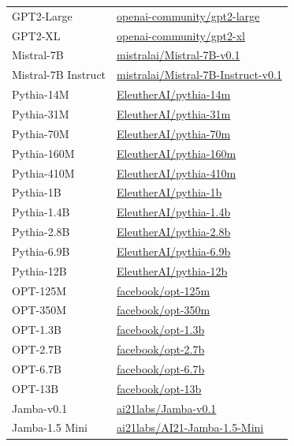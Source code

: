 \documentclass{article} \usepackage{iclr2025_conference,times}
\begin{document}
\begin{table}[htbp]
\begin{center}
\begin{tabular}{l|l}
GPT2-Large & \href{https://huggingface.co/openai-community/gpt2-large}{openai-community/gpt2-large}\\
GPT2-XL & \href{https://huggingface.co/openai-community/gpt2-xl}{openai-community/gpt2-xl}\\
\midrule
Mistral-7B & \href{https://huggingface.co/mistralai/Mistral-7B-v0.1}{mistralai/Mistral-7B-v0.1}\\
Mistral-7B Instruct & \href{https://huggingface.co/mistralai/Mistral-7B-Instruct-v0.1}{mistralai/Mistral-7B-Instruct-v0.1} \\
\midrule
Pythia-14M & \href{https://huggingface.co/EleutherAI/pythia-14m}{EleutherAI/pythia-14m} \\
Pythia-31M & \href{https://huggingface.co/EleutherAI/pythia-31m}{EleutherAI/pythia-31m} \\
Pythia-70M & \href{https://huggingface.co/EleutherAI/pythia-70m}{EleutherAI/pythia-70m} \\
Pythia-160M & \href{https://huggingface.co/EleutherAI/pythia-160m}{EleutherAI/pythia-160m} \\
Pythia-410M & \href{https://huggingface.co/EleutherAI/pythia-410m}{EleutherAI/pythia-410m} \\
Pythia-1B & \href{https://huggingface.co/EleutherAI/pythia-1b}{EleutherAI/pythia-1b} \\
Pythia-1.4B & \href{https://huggingface.co/EleutherAI/pythia-1.4b}{EleutherAI/pythia-1.4b} \\
Pythia-2.8B & \href{https://huggingface.co/EleutherAI/pythia-2.8b}{EleutherAI/pythia-2.8b} \\
Pythia-6.9B & \href{https://huggingface.co/EleutherAI/pythia-6.9b}{EleutherAI/pythia-6.9b} \\
Pythia-12B & \href{https://huggingface.co/EleutherAI/pythia-12b}{EleutherAI/pythia-12b} \\
\midrule
OPT-125M & \href{https://huggingface.co/facebook/opt-125m}{facebook/opt-125m} \\
OPT-350M & \href{https://huggingface.co/facebook/opt-350m}{facebook/opt-350m} \\
OPT-1.3B & \href{https://huggingface.co/facebook/opt-1.3b}{facebook/opt-1.3b} \\
OPT-2.7B & \href{https://huggingface.co/facebook/opt-2.7b}{facebook/opt-2.7b} \\
OPT-6.7B & \href{https://huggingface.co/facebook/opt-6.7b}{facebook/opt-6.7b} \\
OPT-13B & \href{https://huggingface.co/facebook/opt-13b}{facebook/opt-13b} \\
\midrule
Jamba-v0.1 &  \href{https://huggingface.co/ai21labs/Jamba-v0.1}{ai21labs/Jamba-v0.1} \\
Jamba-1.5 Mini & \href{https://huggingface.co/ai21labs/AI21-Jamba-1.5-Mini}{ai21labs/AI21-Jamba-1.5-Mini} \\
\bottomrule
\end{tabular}
\end{center}
\label{model_link}
\end{table}
\end{document}
